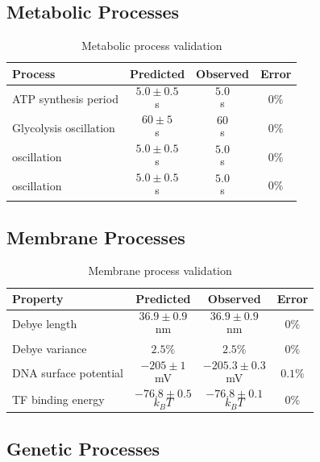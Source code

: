 \documentclass[11pt,twocolumn,a4paper]{article}
\theoremstyle{remark}
\begin{document}
\subsection{Metabolic Processes}

\begin{table}[htbp]
\centering
\caption{Metabolic process validation}
\label{tab:metabolic_validation}
\begin{tabular}{lccc}
\toprule
\textbf{Process} & \textbf{Predicted} & \textbf{Observed} & \textbf{Error} \\
\midrule
ATP synthesis period & $$5.0 \pm 0.5$$ s & $$5.0$$ s & $$0\%$$ \\
Glycolysis oscillation & $$60 \pm 5$$ s & $$60$$ s & $$0\%$$ \\
[Mg$$^{2+}$$] oscillation & $$5.0 \pm 0.5$$ s & $$5.0$$ s & $$0\%$$ \\
[K$$^+$$] oscillation & $$5.0 \pm 0.5$$ s & $$5.0$$ s & $$0\%$$ \\
\bottomrule
\end{tabular}
\end{table}

\subsection{Membrane Processes}

\begin{table}[htbp]
\centering
\caption{Membrane process validation}
\label{tab:membrane_validation}
\begin{tabular}{lccc}
\toprule
\textbf{Property} & \textbf{Predicted} & \textbf{Observed} & \textbf{Error} \\
\midrule
Debye length & $$36.9 \pm 0.9$$ nm & $$36.9 \pm 0.9$$ nm & $$0\%$$ \\
Debye variance & $$2.5\%$$ & $$2.5\%$$ & $$0\%$$ \\
DNA surface potential & $$-205 \pm 1$$ mV & $$-205.3 \pm 0.3$$ mV & $$0.1\%$$ \\
TF binding energy & $$-76.8 \pm 0.5$$ $$k_BT$$ & $$-76.8 \pm 0.1$$ $$k_BT$$ & $$0\%$$ \\
\bottomrule
\end{tabular}
\end{table}

\subsection{Genetic Processes}
\end{document}
